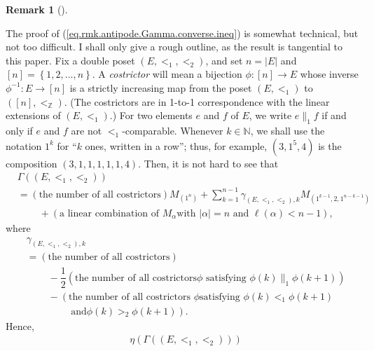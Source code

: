 \documentclass[numbers=enddot,12pt,final,onecolumn,notitlepage,abstracton]{scrartcl}
\theoremstyle{definition}
\newtheorem{remk}[theo]{Remark}
\newenvironment{remark}[1][]
{\begin{remk}[#1]\begin{leftbar}}
{\end{leftbar}\end{remk}}
\let\sumnonlimits\sum
\renewcommand{\sum}{\sumnonlimits\limits}
\newenvironment{verlong}{}{}
\newcommand{\NN}{{\mathbb{N}}}
\begin{document}
\begin{remark}
\begin{verlong}
The proof of (\ref{eq.rmk.antipode.Gamma.converse.ineq}) is somewhat
technical, but not too difficult. I shall only give a rough outline, as the
result is tangential to this paper. Fix a double poset $\left(  E,<_{1}%
,<_{2}\right)  $, and set $n=\left\vert E\right\vert $ and $\left[  n\right]
=\left\{  1,2,\ldots,n\right\}  $. A \textit{costrictor} will mean a bijection
$\phi:\left[  n\right]  \rightarrow E$ whose inverse $\phi^{-1}:E\rightarrow
\left[  n\right]  $ is a strictly increasing map from the poset $\left(
E,<_{1}\right)  $ to $\left(  \left[  n\right]  ,<_{\mathbb{Z}}\right)  $.
(The costrictors are in 1-to-1 correspondence with the linear extensions of
$\left(  E,<_{1}\right)  $.) For two elements $e$ and $f$ of $E$, we write
$e\parallel_{1}f$ if and only if $e$ and $f$ are not $<_{1}$-comparable.
Whenever $k \in \NN$, we shall use the notation $1^k$ for ``$k$ ones,
written in a row''; thus, for example, $\left(3,1^5,4\right)$ is the
composition $\left(3,1,1,1,1,1,4\right)$.
Then, it is not hard to see that
\begin{align*}
& \Gamma\left(  \left(  E,<_{1},<_{2}\right)  \right)  \\
& =\left(  \text{the number of all costrictors}\right)  M_{\left(
1^{n}\right)  }+\sum_{k=1}^{n-1}\gamma_{\left(  E,<_{1},<_{2}\right)
,k}M_{\left(  1^{k-1},2,1^{n-k-1}\right)  }\\
& \ \ \ \ \ \ \ \ \ \ +\left(  \text{a linear combination of }M_{\alpha}\text{
with }\left|\alpha\right| = n \text{ and } \ell\left(  \alpha\right)  <n-1\right)  ,
\end{align*}
where
\begin{align*}
& \gamma_{\left(  E,<_{1},<_{2}\right)  ,k}\\
& =\left(  \text{the number of all costrictors}\right)  \\
& \ \ \ \ \ \ \ \ \ \ -\dfrac{1}{2}\left(  \text{the number of all costrictors
}\phi\text{ satisfying }\phi\left(  k\right)  \parallel_{1}\phi\left(
k+1\right)  \right)  \\
& \ \ \ \ \ \ \ \ \ \ -\left(  \text{the number of all costrictors }\phi\text{
satisfying }\phi\left(  k\right)  <_{1}\phi\left(  k+1\right) \right. \\
& \ \ \ \ \ \ \ \ \ \ \qquad \left. \text{ and
}\phi\left(  k\right)  >_{2}\phi\left(  k+1\right)  \right)  .
\end{align*}
Hence,
\begin{align*}
& \eta\left(  \Gamma\left(  \left(  E,<_{1},<_{2}\right)  \right)  \right)

\end{align*}
\end{verlong}
\end{remark}
\end{document}

